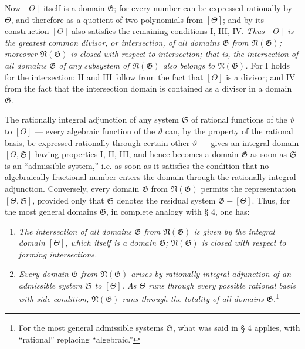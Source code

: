 \documentclass[11pt]{article}
\begin{document}
Now $[\Theta]$ itself is a domain $\mathfrak G$; for every number can be
expressed rationally by $\Theta$, and therefore as a quotient of two polynomials
from $[\Theta]$; and by its construction $[\Theta]$ also satisfies the remaining
conditions I, III, IV. \emph{Thus $[\Theta]$ is the greatest common divisor, or
intersection, of all domains $\mathfrak G$ from $\mathfrak N(\mathfrak G)$;
moreover $\mathfrak N(\mathfrak G)$ is closed with respect to intersection; that
is, the intersection of all domains $\mathfrak G$ of any subsystem of
$\mathfrak N(\mathfrak G)$ also belongs to $\mathfrak N(\mathfrak G)$.} For I
holds for the intersection; II and III follow from the fact that $[\Theta]$ is a
divisor; and IV from the fact that the intersection domain is contained as a
divisor in a domain $\mathfrak G$.

The rationally integral adjunction of any system $\mathfrak S$ of rational
functions of the $\vartheta$ to $[\Theta]$ --- every algebraic function of the
$\vartheta$ can, by the property of the rational basis, be expressed rationally
through certain other $\vartheta$ --- gives an integral domain
$[\Theta,\mathfrak S]$ having properties I, II, III, and hence becomes a domain
$\mathfrak G$ as soon as $\mathfrak S$ is an ``admissible system,'' i.e. as soon
as it satisfies the condition that no algebraically fractional number enters the
domain through the rationally integral adjunction. Conversely, every domain
$\mathfrak G$ from $\mathfrak N(\mathfrak G)$ permits the representation
$[\Theta,\mathfrak S]$, provided only that $\mathfrak S$ denotes the residual
system $\mathfrak G-[\Theta]$. Thus, for the most general domains
$\mathfrak G$, in complete analogy with § 4, one has:
\begin{enumerate}
\item[a)] \emph{The intersection of all domains $\mathfrak G$ from
$\mathfrak N(\mathfrak G)$ is given by the integral domain $[\Theta]$, which
itself is a domain $\mathfrak G$; $\mathfrak N(\mathfrak G)$ is closed with
respect to forming intersections.}
\item[b)] \emph{Every domain $\mathfrak G$ from $\mathfrak N(\mathfrak G)$
arises by rationally integral adjunction of an admissible system $\mathfrak S$ to
$[\Theta]$. As $\Theta$ runs through every possible rational basis with side
condition, $\mathfrak N(\mathfrak G)$ runs through the totality of all domains
$\mathfrak G$.}\footnote{For the most general admissible systems $\mathfrak S$,
what was said in § 4 applies, with ``rational'' replacing ``algebraic.''}
\end{enumerate}
\end{document}
